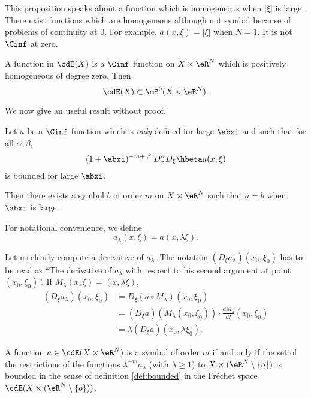 This proposition speaks about a function which is homogeneous when $|\xi|$ is large. There exist functions which are homogeneous although not symbol because of problems of continuity at $0$. For example, $a(x,\xi)=|\xi|$ when $N=1$. It is not $\Cinf$ at zero.
\begin{remark}
   A function in $\cdE(X)$ is a $\Cinf$ function on $X\times\eR^N$ which is positively homogeneous of degree zero. Then
\[
    \cdE(X)\subset\mS^0(X\times\eR^N).
\]
\end{remark}

We now give an useful result without proof.
\begin{proposition}
Let $a$ be a $\Cinf$ function which is \emph{only} defined for large $\abxi$ and such that for all $\alpha,\beta$,
\[
  (1+\abxi)^{-m+|\beta|}D_x^{\alpha} D_{\xi}\hbeta a(x,\xi)
\]
is bounded for large $\abxi$.

Then there exists a symbol $b$ of order $m$ on $X\times \eR^N$ such that $a=b$ when $\abxi$ is large.
\end{proposition}

For notational convenience, we define 
\begin{equation} \label{eq:def_ablambda}
   a_{\lambda}(x,\xi)=a(x,\lambda\xi).
\end{equation}

Let us clearly compute a derivative of $a_{\lambda}$. The notation $(D_{\xi}a_{\lambda})(x_0,\xi_0)$ has to be read as ``The derivative of $a_{\lambda}$ with respect to his second argument at point $(x_0,\xi_0)$''.  If $M_{\lambda}(x,\xi)=(x,\lambda\xi)$,
\begin{equation}
\begin{split}
  (D_{\xi}a_{\lambda})(x_0,\xi_0)&=D_{\xi}(a\circ M_{\lambda})(x_0,\xi_0)\\
                                 &=(D_{\xi}a)(M_{\lambda}(x_0,\xi_0))\cdot \frac{dM_{\lambda}}{d\xi}(x_0,\xi_0)\\
                                 &=\lambda(D_{\xi}a)(x_0,\lambda\xi_0).
\end{split}
\end{equation}

\begin{theorem}\label{tho:dieu23.16.6}
   A function $a\in\cdE(X\times\eR^N)$ is a symbol of order $m$ if and only if the set of the restrictions of the functions $\lambda^{-m}a_{\lambda}$ (with $\lambda\geq 1$) to $X\times(\eR^N\setminus\{o\})$ is bounded in the sense of definition \ref{def:bounded}   in the Fréchet space $\cdE(X\times(\eR^N\setminus\{o\}))$.
\end{theorem}

